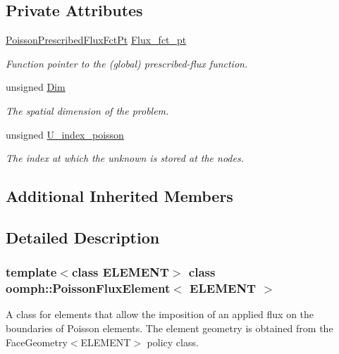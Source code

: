 \subsection*{Private Attributes}
\begin{DoxyCompactItemize}
\item 
\hyperlink{classoomph_1_1PoissonFluxElement_a667254e1d7fea39ba393e0d9853f216d}{Poisson\+Prescribed\+Flux\+Fct\+Pt} \hyperlink{classoomph_1_1PoissonFluxElement_ad737032d93200748f1c48e22c2cc0e9b}{Flux\+\_\+fct\+\_\+pt}
\begin{DoxyCompactList}\small\item\em Function pointer to the (global) prescribed-\/flux function. \end{DoxyCompactList}\item 
unsigned \hyperlink{classoomph_1_1PoissonFluxElement_a2ba672aba6d197451151700733254f4c}{Dim}
\begin{DoxyCompactList}\small\item\em The spatial dimension of the problem. \end{DoxyCompactList}\item 
unsigned \hyperlink{classoomph_1_1PoissonFluxElement_ab504c339a71a90ae4975071368b1f84c}{U\+\_\+index\+\_\+poisson}
\begin{DoxyCompactList}\small\item\em The index at which the unknown is stored at the nodes. \end{DoxyCompactList}\end{DoxyCompactItemize}
\subsection*{Additional Inherited Members}


\subsection{Detailed Description}
\subsubsection*{template$<$class E\+L\+E\+M\+E\+NT$>$\newline
class oomph\+::\+Poisson\+Flux\+Element$<$ E\+L\+E\+M\+E\+N\+T $>$}

A class for elements that allow the imposition of an applied flux on the boundaries of Poisson elements. The element geometry is obtained from the Face\+Geometry$<$\+E\+L\+E\+M\+E\+N\+T$>$ policy class. 

